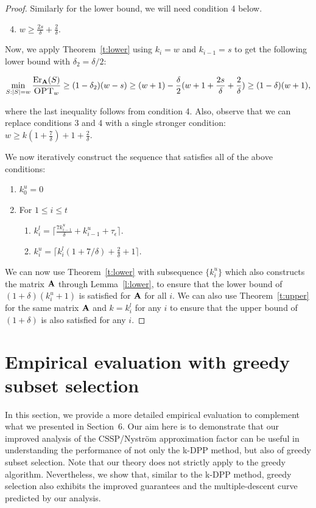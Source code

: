 \documentclass{article}
\begin{document}
\begin{proof}
Similarly for the lower bound, we will need condition 4 below.
\begin{enumerate}
  \setcounter{enumi}{3}

	\item $w \geq \frac{ 2s}{\delta} +\frac{2}{\delta}$.
\end{enumerate}
 Now, we apply Theorem~\ref{t:lower} using $k_i=w$ and $k_{i-1}=s$ to get the following lower bound with $\delta_2 = \delta/2$: 

\[\min_{S:|S|=w}\frac{\mathrm{Er}_\mathbf A(S)}{\textsc{OPT}_w}\geq (1-\delta_2) (w- s) \geq (w + 1) - \frac{\delta}{2} (w+ 1 + \frac{2s}{\delta} + \frac{2}{\delta}) \geq (1-\delta) (w+1),   \]

where the last inequality follows from condition 4. Also, observe that
we can replace conditions 3 and 4 with a single stronger condition: $w \geq k(1 + \frac{7}{\delta}) + 1+ \frac{2}{\delta}$.

We now iteratively construct the sequence that satisfies all of the
above conditions:
\begin{enumerate}
\item $k^u_0 = 0 $
\item For $1 \leq i \leq t$ 
  \begin{enumerate}
  \item $k^l_i =  \big\lceil\frac{7k^u_{i-1}}{\delta}  + k^u_{i-1} + \tau_\epsilon \big\rceil$.
  \item $k^u_i = \lceil k^l_i (1 + 7/\delta) + \frac{2}{\delta} + 1\rceil$. 
  \end{enumerate}
\end{enumerate}                
We can now use Theorem~\ref{t:lower} with subsequence
$\{k^u_i\}$ which also constructs the matrix $\mathbf A$ through
Lemma~\ref{l:lower}, to ensure that the lower bound of
$(1+\delta)(k^u_i+1)$ is satisfied for $\mathbf A$ for all $i$. We
can also use Theorem~\ref{t:upper} for the same matrix $\mathbf A$
and $k=k^l_i$ for any $i$ to ensure that the upper bound of
$(1+\delta)$ is also satisfied for any $i$. 
 \end{proof}

 \section{Empirical evaluation with greedy subset selection}
 \label{a:greedy}
 In this section, we provide a more detailed empirical evaluation to
 complement what we presented in Section~6. Our aim here is to demonstrate
that our improved analysis of the CSSP/Nystr\"om approximation factor
can be useful in understanding the performance of not only the k-DPP
method, but also of greedy subset selection. Note that our theory
does not strictly apply to the greedy algorithm. Nevertheless, we show
that, similar to the k-DPP method, greedy selection also exhibits the
improved guarantees and the multiple-descent curve predicted by our
analysis.  
\end{document}
